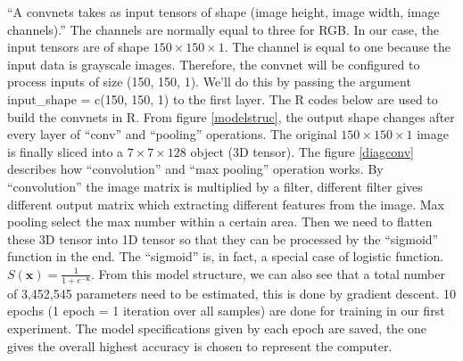 \documentclass[12pt]{article}
\begin{document}
``A convnets takes as input tensors of shape (image height, image width,
image channels).''\citep{DLR18} The channels are normally equal to three
for RGB. In our case, the input tensors are of shape
\(150 \times 150 \times 1\). The channel is equal to one because the
input data is grayscale images. Therefore, the convnet will be
configured to process inputs of size (150, 150, 1). We'll do this by
passing the argument input\_shape = c(150, 150, 1) to the first layer.
The R codes below are used to build the convnets in R. From figure
\ref{modelstruc}, the output shape changes after every layer of ``conv''
and ``pooling'' operations. The original \(150 \times 150 \times 1\)
image is finally sliced into a \(7 \times 7 \times 128\) object (3D
tensor). The figure \ref{diagconv} describes how ``convolution'' and
``max pooling'' operation works. By ``convolution'' the image matrix is
multiplied by a filter, different filter gives different output matrix
which extracting different features from the image. Max pooling select
the max number within a certain area. Then we need to flatten these 3D
tensor into 1D tensor so that they can be processed by the ``sigmoid''
function in the end. The ``sigmoid'' is, in fact, a special case of
logistic function. \(S(\textbf{x})=\frac{1}{1+e^{-\textbf{x}}}\). From
this model structure, we can also see that a total number of 3,452,545
parameters need to be estimated, this is done by gradient descent. 10
epochs (1 epoch = 1 iteration over all samples) are done for training in
our first experiment. The model specifications given by each epoch are
saved, the one gives the overall highest accuracy is chosen to represent
the computer.
\end{document}
